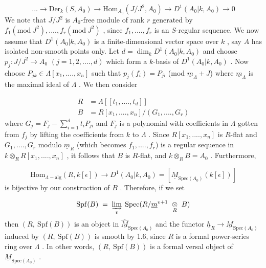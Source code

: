 \begin{equation*}
... \to \mathrm{Der}_k(S, A_0) \to \mathrm{Hom}_{A_0}(J/J^2, A_0) \to D^1(A_0|k, A_0) \to 0
\end{equation*}
We note that  $J/J^2$  is  $A_0$-free module of rank  $r$  generated by $f_1(\mathrm{mod}\ J^2),....,f_r(\mathrm{mod}\ J^2)$  , since  $f_1,....,f_r$  is an $S$-regular sequence. We now assume that  $D^1(A_0|k, A_0)$  is a finite-dimensional vector space over  $k$  , say  $A$ has isolated non-smooth points only. Let  $d = \dim_k D^1(A_0|k, A_0)$  and choose $p_j : J/J^2 \to A_0$   $(j = 1, 2,....,d)$  which form a $k$-basis of  $D^1(A_0|k, A_0)$  . Now choose  $P_{jk} \in \Lambda[x_1,....,x_n]$  such that  $p_j(f_i) = P_{ji}$  (mod $\underline{m}_\Lambda + J$)  where  $\underline{m}_\Lambda$  is the maximal ideal of  $\Lambda$  . We then consider

\begin{equation*}
\begin{aligned}
R &= \Lambda[[t_1,....,t_d]] \\
B &= R[x_1,....,x_n]/(G_1,....,G_r)
\end{aligned}
\end{equation*}
where  $G_j = F_j - \sum_{i=1}^{d} t_i P_{ji}$  and  $F_j$  is a polynomial with coefficients in  $\Lambda$ gotten from  $f_j$  by lifting the coefficients from  $k$  to  $\Lambda$  . Since $R[x_1,....,x_n]$  is $R$-flat and  $G_1,....,G_r$  modulo  $\underline{m}_R$  (which becomes  $f_1,....,f_r$) is a regular sequence in  $k \otimes_R R[x_1,....,x_n]$  , it follows that  $B$  is $R$-flat, and $k \otimes_R B = A_0$  . Furthermore,

\begin{equation*}
\mathrm{Hom}_{\Lambda-\mathrm{alg}}(R, k[\epsilon]) \to D^1(A_0|k, A_0) = [\underline{M}_{\mathrm{Spec}(A_0)}(k[\epsilon])]
\end{equation*}
is bijective by our construction of  $B$  . Therefore, if we set 



\begin{equation*}
 \mathrm{Spf}(B) \;=\; \varinjlim_{v}\; \mathrm{Spec}(R/\underline{m}^{v+1}\ \underset{R}{\otimes}\ B)
\end{equation*}
then  $(R,\ \mathrm{Spf}(B))$  is an object in  $\widehat{\underline{M}}_{\mathrm{Spec}(A_0)}$  and the functor  $\underline{h}_R \to \underline{M}_{\mathrm{Spec}(A_0)}$  induced by  $(R,\ \mathrm{Spf}(B))$  is smooth by 1.6, since  $R$  is a formal power-series ring over  $\Lambda$  . In other words,  $(R,\ \mathrm{Spf}(B))$  is a formal versal object of  $\underline{M}_{\mathrm{Spec}(A_0)}$  .

